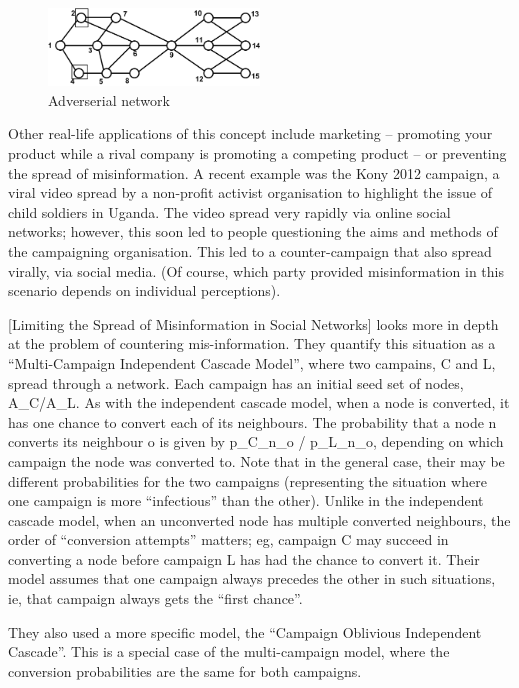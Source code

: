 \begin{figure}[htbp]
\centering
\includegraphics[width=0.5\textwidth]{./img/adversial_network.png}
\caption{Adverserial network}
\label{fig:adverserial_network}
\end{figure}

Other real-life applications of this concept include marketing -- promoting your product while a rival company is promoting a competing product -- or preventing the spread of misinformation. A recent example was the Kony 2012 campaign, a viral video spread by a non-profit activist organisation to highlight the issue of child soldiers in Uganda. The video spread very rapidly via online social networks; however, this soon led to people questioning the aims and methods of the campaigning organisation. This led to a counter-campaign that also spread virally, via social media. (Of course, which party provided misinformation in this scenario depends on individual perceptions).

[Limiting the Spread of Misinformation in Social Networks] looks more in depth at the problem of countering mis-information. They quantify this situation as a ``Multi-Campaign Independent Cascade Model'', where two campains, C and L, spread through a network. Each campaign has an initial seed set of nodes, A\_C/A\_L. As with the independent cascade model, when a node is converted, it has one chance to convert each of its neighbours. The probability that a node n converts its neighbour o is given by p\_C\_n\_o / p\_L\_n\_o, depending on which campaign the node was converted to. Note that in the general case, their may be different probabilities for the two campaigns (representing the situation where one campaign is more ``infectious'' than the other). Unlike in the independent cascade model, when an unconverted node has multiple converted neighbours, the order of ``conversion attempts'' matters; eg, campaign C may succeed in converting a node before campaign L has had the chance to convert it. Their model assumes that one campaign always precedes the other in such situations, ie, that campaign always gets the ``first chance''.

They also used a more specific model, the ``Campaign Oblivious Independent Cascade''. This is a special case of the multi-campaign model, where the conversion probabilities are the same for both campaigns.

